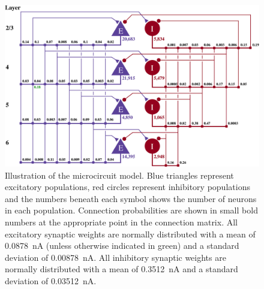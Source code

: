 \documentclass[utf8]{frontiersSCNS} %
\begin{document}
%
\begin{figure}[t!]
    \begin{center}
        \includegraphics[width=180mm]{figures/potjans_circuit_v2}
    \end{center}
    \caption{Illustration of the microcircuit model.
    Blue triangles represent excitatory populations, red circles represent inhibitory populations and the numbers beneath each symbol shows the number of neurons in each population.
    Connection probabilities are shown in small bold numbers at the appropriate point in the connection matrix.
    All excitatory synaptic weights are normally distributed with a mean of \SI{0.0878}{\nano\ampere} (unless otherwise indicated in green) and a standard deviation of \SI{0.00878}{\nano\ampere}.
    All inhibitory synaptic weights are normally distributed with a mean of \SI{0.3512}{\nano\ampere} and a standard deviation of \SI{0.03512}{\nano\ampere}.}
    \label{fig:potjans_circuit}
\end{figure}
%
\end{document}
